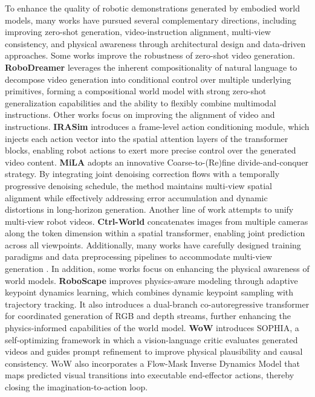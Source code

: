To enhance the quality of robotic demonstrations generated by embodied world models, many works have pursued several complementary directions, including improving zero-shot generation, video-instruction alignment, multi-view consistency, and physical awareness through architectural design and data-driven approaches.
Some works improve the robustness of zero-shot video generation. \textbf{RoboDreamer} \cite{RoboDreamer} leverages the inherent compositionality of natural language to decompose video generation into conditional control over multiple underlying primitives, forming a compositional world model with strong zero-shot generalization capabilities and the ability to flexibly combine multimodal instructions. 
Other works focus on improving the alignment of video and instructions. \textbf{IRASim} \cite{IRASim} introduces a frame-level action conditioning module, which injects each action vector into the spatial attention layers of the transformer blocks, enabling robot actions to exert more precise control over the generated video content. \textbf{MiLA} \cite{MiLA} adopts an innovative Coarse-to-(Re)fine divide-and-conquer strategy. By integrating joint denoising correction flows with a temporally progressive denoising schedule, the method maintains multi-view spatial alignment while effectively addressing error accumulation and dynamic distortions in long-horizon generation. 
Another line of work attempts to unify multi-view robot videos. \textbf{Ctrl-World} \cite{Ctrl-World} concatenates images from multiple cameras along the token dimension within a spatial transformer, enabling joint prediction across all viewpoints. Additionally, many works have carefully designed training paradigms and data preprocessing pipelines to accommodate multi-view generation \cite{EnerVerse, geminiroboticsteam, Scalable_Policy_Evaluation, Geometry-aware, vidar, Genie-Envisioner}. 
In addition, some works focus on enhancing the physical awareness of world models. \textbf{RoboScape} \cite{RoboScape} improves physics-aware modeling through adaptive keypoint dynamics learning, which combines dynamic keypoint sampling with trajectory tracking. It also introduces a dual-branch co-autoregressive transformer for coordinated generation of RGB and depth streams, further enhancing the physics-informed capabilities of the world model. \textbf{WoW} \cite{WoW} introduces SOPHIA, a self-optimizing framework in which a vision-language critic evaluates generated videos and guides prompt refinement to improve physical plausibility and causal consistency. WoW also incorporates a Flow-Mask Inverse Dynamics Model that maps predicted visual transitions into executable end-effector actions, thereby closing the imagination-to-action loop.


